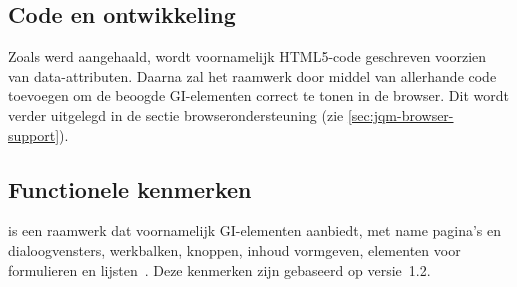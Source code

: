 \subsection{Code en ontwikkeling}
Zoals werd aangehaald, wordt voornamelijk HTML5-code geschreven voorzien van data-attributen. 
Daarna zal het raamwerk door middel van  allerhande code toevoegen om de beoogde GI-elementen correct te tonen in de browser. 
Dit wordt verder uitgelegd in de sectie browserondersteuning (zie \ref{sec:jqm-browser-support}).

\subsection{Functionele kenmerken}
\jqm{} is een raamwerk dat voornamelijk GI-elementen aanbiedt, met name pagina's en dialoogvensters, werkbalken, knoppen, inhoud vormgeven, elementen voor formulieren en lijsten~\cite{JQuery2012b}.
Deze kenmerken zijn gebaseerd op versie~1.2.

